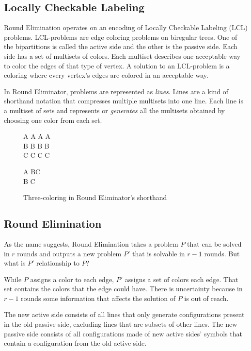 \documentclass[english, 12pt, a4paper, sci, utf8, a-1b, online]{aaltothesis}
\begin{document}
\subsection{Locally Checkable Labeling}

Round Elimination operates on an encoding of Locally Checkable Labeling (LCL) problems. LCL-problems are edge coloring problems on biregular trees. One of the bipartitions is called the active side and the other is the passive side. Each side has a set of multisets of colors. Each multiset describes one acceptable way to color the edges of that type of vertex. A solution to an LCL-problem is a coloring where every vertex's edges are colored in an acceptable way.

In Round Eliminator, problems are represented as \emph{lines}. Lines are a kind of shorthand notation that compresses multiple multisets into one line. Each line is a multiset of sets and represents or \emph{generates} all the multisets obtained by choosing one color from each set.\cite{RE}

\begin{figure}[h]
\centering
\begin{tcolorbox}[width=.2\textwidth, nobeforeafter, title=active side]
A A A A \\
B B B B \\
C C C C
\end{tcolorbox}
\begin{tcolorbox}[width=.2\textwidth, nobeforeafter, title=passive side]
A BC \\
B C
\end{tcolorbox}
\caption{Three-coloring in Round Eliminator's shorthand}
\end{figure}

\subsection{Round Elimination}

As the name suggests, Round Elimination takes a problem $P$ that can be solved in $r$ rounds and outputs a new problem $P'$ that is solvable in $r-1$ rounds. But what is $P'$ relationship to $P$?

While $P$ assigns a color to each edge, $P'$ assigns a set of colors each edge. That set contains the colors that the edge could have. There is uncertainty because in $r-1$ rounds some information that affects the solution of $P$ is out of reach.

The new active side consists of all lines that only generate configurations present in the old passive side, excluding lines that are subsets of other lines. The new passive side consists of all configurations made of new active sides' symbols that contain a configuration from the old active side.\cite{DA2020}
\end{document}
